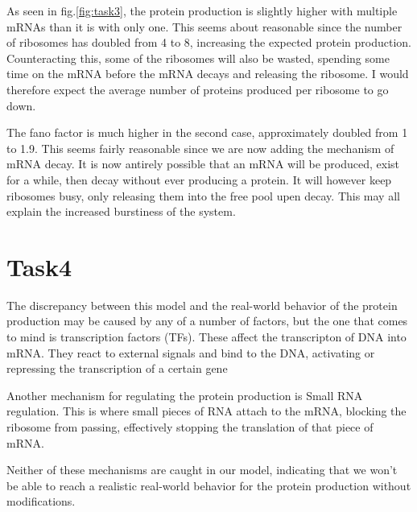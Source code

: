 \documentclass{article}
\begin{document}
As seen in fig.\eqref{fig:task3}, the protein production is slightly higher with multiple mRNAs than it is with only one. This seems about reasonable since the number of ribosomes has doubled from 4 to 8, increasing the expected protein production. Counteracting this, some of the ribosomes will also be wasted, spending some time on the mRNA before the mRNA decays and releasing the ribosome. I would therefore expect the average number of proteins produced per ribosome to go down. 


The fano factor is much higher in the second case, approximately doubled from 1 to 1.9. This seems fairly reasonable since we are now adding the mechanism of mRNA decay. It is now antirely possible that an mRNA will be produced, exist for a while, then decay without ever producing a protein. It will however keep ribosomes busy, only releasing them into the free pool upen decay. This may all explain the increased burstiness of the system. 





\section{Task4}
The discrepancy between this model and the real-world behavior of the protein production may be caused by any of a number of factors, but the one that comes to mind is transcription factors (TFs). These affect the transcripton of DNA into mRNA. They react to external signals and bind to the DNA, activating or repressing the transcription of a certain gene

Another mechanism for regulating the protein production is Small RNA regulation. This is where small pieces of RNA attach to the mRNA, blocking the ribosome from passing, effectively stopping the translation of that piece of mRNA. 

Neither of these mechanisms are caught in our model, indicating that we won't be able to reach a realistic real-world behavior for the protein production without modifications. 
\end{document}
